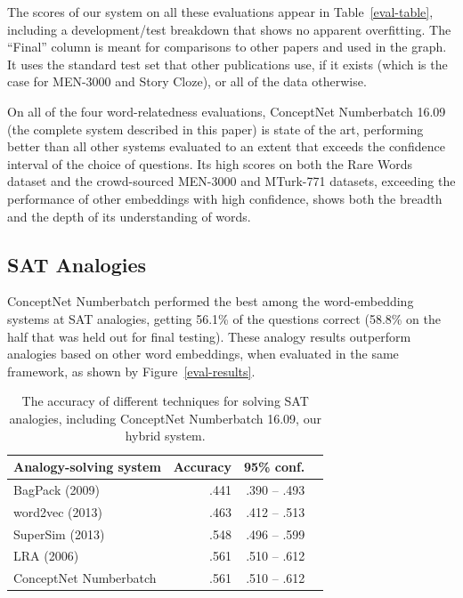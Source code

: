 \documentclass[letterpaper]{article}
\begin{document}
The scores of our system on all these evaluations appear in
Table~\ref{eval-table}, including a development/test breakdown that shows no
apparent overfitting. The ``Final'' column is meant for comparisons to other
papers and used in the graph. It uses the standard test set that other
publications use, if it exists (which is the case for MEN-3000 and Story
Cloze), or all of the data otherwise.

On all of the four word-relatedness evaluations, ConceptNet Numberbatch 16.09
(the complete system described in this paper) is state of the art, performing
better than all other systems evaluated to an extent that exceeds the
confidence interval of the choice of questions. Its high scores on both the
Rare Words dataset and the crowd-sourced MEN-3000 and MTurk-771 datasets,
exceeding the performance of other embeddings with high confidence, shows both
the breadth and the depth of its understanding of words.

\subsection{SAT Analogies}

ConceptNet Numberbatch performed the best among the word-embedding systems at
SAT analogies, getting 56.1\% of the questions correct (58.8\% on the half that
was held out for final testing).  These analogy results outperform analogies
based on other word embeddings, when evaluated in the same framework, as shown
by Figure~\ref{eval-results}.

\begin{table}[t]
\centering
\begin{tabular}{lrrr}
\bf Analogy-solving system   & \bf Accuracy & \bf 95\% conf. \\
\hline
    BagPack (2009)           & .441 & .390 -- .493 \\
    word2vec (2013)          & .463 & .412 -- .513 \\
    SuperSim (2013)          & .548 & .496 -- .599 \\
    LRA (2006)               & .561 & .510 -- .612 \\
    ConceptNet Numberbatch   & .561 & .510 -- .612
\end{tabular}
    \caption{The accuracy of different techniques for solving SAT analogies,
    including ConceptNet Numberbatch 16.09, our hybrid system.}
\label{analogy-eval-table}
\end{table}
\end{document}
